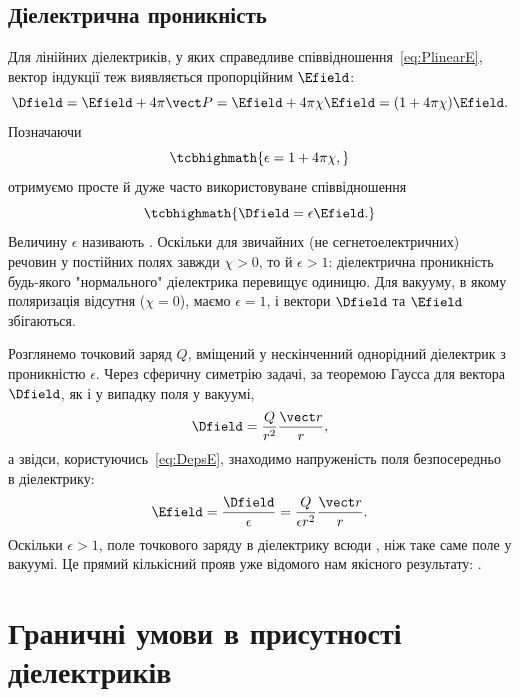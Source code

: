 \subsection*{Діелектрична проникність}

Для лінійних діелектриків, у яких справедливе співвідношення~\eqref{eq:PlinearE}, вектор індукції теж виявляється пропорційним $\Efield$:
\begin{equation*}
	\Dfield = \Efield + 4\pi\vect P = \Efield + 4\pi\chi\Efield = (1+4\pi\chi)\Efield.
\end{equation*}
Позначаючи
\begin{equation}\label{eq:eps}
	\tcbhighmath{
		\epsilon = 1 + 4\pi\chi,
	}
\end{equation}
отримуємо просте й дуже часто використовуване співвідношення
\begin{equation}\label{eq:DepsE}
	\tcbhighmath{
		\Dfield = \epsilon\Efield.
	}
\end{equation}
Величину $\epsilon$ називають . Оскільки для звичайних (не сегнетоелектричних) речовин у постійних полях
завжди $\chi > 0$, то й $\epsilon > 1$: діелектрична проникність будь-якого "нормального" діелектрика перевищує одиницю. Для вакууму, в якому
поляризація відсутня ($\chi = 0$), маємо $\epsilon = 1$, і вектори $\Dfield$ та $\Efield$ збігаються.

 Розглянемо точковий заряд $Q$, вміщений у нескінченний однорідний діелектрик з проникністю $\epsilon$. Через сферичну симетрію
задачі, за теоремою Гаусса для вектора $\Dfield$, як і у випадку поля у вакуумі,
\begin{equation*}
	\Dfield = \frac{Q}{r^2}\frac{\vect r}{r},
\end{equation*}
а звідси, користуючись~\eqref{eq:DepsE}, знаходимо напруженість поля безпосередньо в діелектрику:
\begin{equation*}
	\Efield = \frac{\Dfield}{\epsilon} = \frac{Q}{\epsilon r^2}\frac{\vect r}{r}.
\end{equation*}
Оскільки $\epsilon > 1$, поле точкового заряду в діелектрику всюди , ніж таке саме поле у вакуумі. Це прямий кількісний прояв уже
відомого нам якісного результату: .

\section{Граничні умови в присутності діелектриків}

